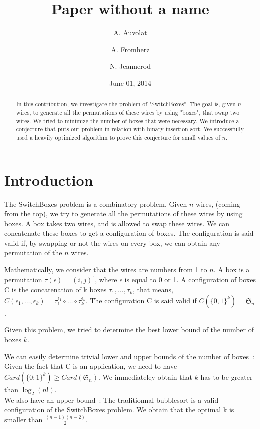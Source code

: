 \documentclass[11pt, a4paper]{article}
\begin{document}
\title{Paper without a name}
\author{A. Auvolat \and A. Fromherz \and N. Jeannerod}
\date{June 01, 2014}
\maketitle

\begin{abstract}

In this contribution, we investigate the problem of "SwitchBoxes".  The goal is,
given $n$ wires, to generate all the permutations of these wires by using
"boxes", that swap two wires. We tried to minimize the number of boxes that were
necessary.  We introduce a conjecture that puts our problem in relation with
binary insertion sort.  We successfully used a heavily optimized algorithm to
prove this conjecture for small values of $n$.

\end{abstract}

\section{Introduction}

The SwitchBoxes problem is a combinatory problem. Given $n$ wires, (coming from
the top), we try to generate all the permutations of these wires by using boxes.
A box takes two wires, and is allowed to swap these wires. We can concatenate
these boxes to get a configuration of boxes.  The configuration is said valid
if, by swapping or not the wires on every box, we can obtain any permutation of
	the $n$ wires.

Mathematically, we consider that the wires are numbers from 1 to $n$. A box is a
permutation $\tau(\epsilon) = (i,j)^{\epsilon}$, where $\epsilon$ is equal to 0
or 1.  A configuration of boxes C is the concatenation of k boxes $\tau_1,
\ldots, \tau_k$, that means, $C(\epsilon_1, \ldots, \epsilon_k) =
\tau_1^{\epsilon_1}\circ\ldots\circ\tau_k^{\epsilon_k}$.  The configuration C is
said valid if $C(\{0,1\}^k)= \mathfrak{S}_n$.

Given this problem, we tried to determine the best lower bound of the number of
boxes $k$.

We can easily determine trivial lower and upper bounds of the number of
boxes~:\\ Given the fact that C is an application, we need to have
$Card(\{0;1\}^{k}) \geq Card(\mathfrak{S}_n)$. We immediateley obtain that $k$
has to be greater than $\log_2(n!)$.\\ We also have an upper bound~: The
traditionnal bubblesort is a valid configuration of the SwitchBoxes problem. We
obtain that the optimal k is smaller than $\frac{(n-1)(n-2)}{2}$.
\end{document}
